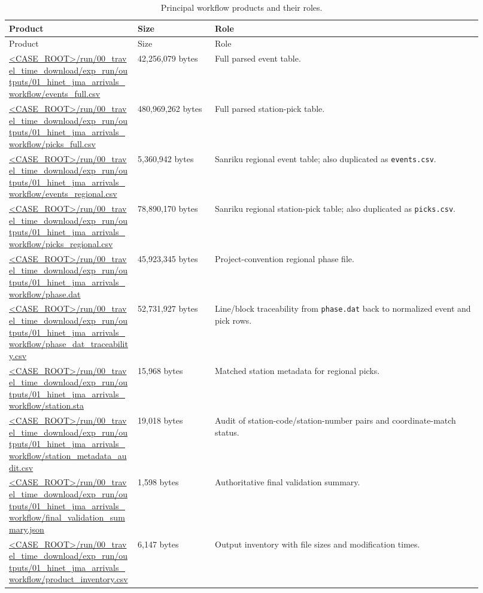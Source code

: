 \documentclass[11pt]{article}
\begin{document}
\begin{longtable}{P{0.25\linewidth}P{0.15\linewidth}P{0.52\linewidth}}
\caption{Principal workflow products and their roles.}\label{tab:outputs}\\
\toprule
Product & Size & Role \\
\midrule
\endfirsthead
\toprule
Product & Size & Role \\
\midrule
\endhead
\bottomrule
\endfoot
\url{<CASE_ROOT>/run/00_travel_time_download/exp_run/outputs/01_hinet_jma_arrivals_workflow/events_full.csv} & 42,256,079 bytes & Full parsed event table. \\
\url{<CASE_ROOT>/run/00_travel_time_download/exp_run/outputs/01_hinet_jma_arrivals_workflow/picks_full.csv} & 480,969,262 bytes & Full parsed station-pick table. \\
\url{<CASE_ROOT>/run/00_travel_time_download/exp_run/outputs/01_hinet_jma_arrivals_workflow/events_regional.csv} & 5,360,942 bytes & Sanriku regional event table; also duplicated as \texttt{events.csv}. \\
\url{<CASE_ROOT>/run/00_travel_time_download/exp_run/outputs/01_hinet_jma_arrivals_workflow/picks_regional.csv} & 78,890,170 bytes & Sanriku regional station-pick table; also duplicated as \texttt{picks.csv}. \\
\url{<CASE_ROOT>/run/00_travel_time_download/exp_run/outputs/01_hinet_jma_arrivals_workflow/phase.dat} & 45,923,345 bytes & Project-convention regional phase file. \\
\url{<CASE_ROOT>/run/00_travel_time_download/exp_run/outputs/01_hinet_jma_arrivals_workflow/phase_dat_traceability.csv} & 52,731,927 bytes & Line/block traceability from \texttt{phase.dat} back to normalized event and pick rows. \\
\url{<CASE_ROOT>/run/00_travel_time_download/exp_run/outputs/01_hinet_jma_arrivals_workflow/station.sta} & 15,968 bytes & Matched station metadata for regional picks. \\
\url{<CASE_ROOT>/run/00_travel_time_download/exp_run/outputs/01_hinet_jma_arrivals_workflow/station_metadata_audit.csv} & 19,018 bytes & Audit of station-code/station-number pairs and coordinate-match status. \\
\url{<CASE_ROOT>/run/00_travel_time_download/exp_run/outputs/01_hinet_jma_arrivals_workflow/final_validation_summary.json} & 1,598 bytes & Authoritative final validation summary. \\
\url{<CASE_ROOT>/run/00_travel_time_download/exp_run/outputs/01_hinet_jma_arrivals_workflow/product_inventory.csv} & 6,147 bytes & Output inventory with file sizes and modification times. \\
\end{longtable}
\end{document}
